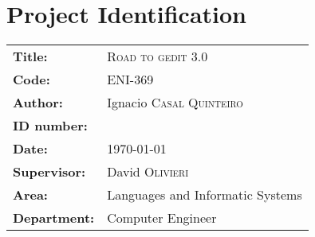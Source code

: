 
\chapter{Project Identification}

\begin{tabular}{ll}
  \textbf{Title:} & \textsc{Road to gedit 3.0}\\
  \textbf{Code:} & ENI-369\\[0.5cm] %
  \textbf{Author:} & Ignacio \textsc{Casal Quinteiro}\\
  \textbf{ID number:} & \\ %
  \textbf{Date:} & \today \\[0.5cm]
  \textbf{Supervisor:} & David \textsc{Olivieri}\\
  \textbf{Area:} & Languages and Informatic Systems\\
  \textbf{Department:} & Computer Engineer\\
\end{tabular}

